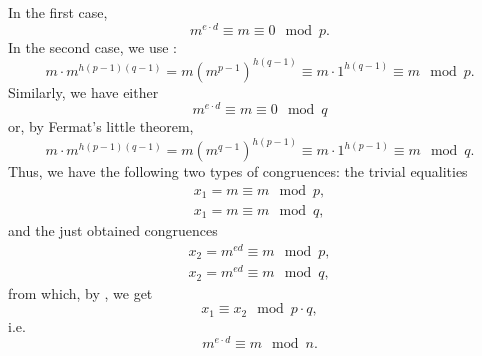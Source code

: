 In the first case,
\[
m^{e \cdot d} \equiv m \equiv 0 \mod{p}.
\]
In the second case, we use
:
\[
m \cdot m^{h \left(p - 1\right)\left(q - 1\right)} 
= m \left(m^{p - 1}\right)^{h \left(q - 1\right)} \equiv m \cdot 1^{h
  \left(q - 1\right)} \equiv m \mod{p}.
\]
Similarly, we have either
\[
m^{e \cdot d} \equiv m \equiv 0 \mod{q}
\]
or, by Fermat's little theorem,
\[
m \cdot m^{h \left(p - 1\right)\left(q - 1\right)} 
= m \left(m^{q - 1}\right)^{h \left(p - 1\right)} \equiv m \cdot 1^{h
  \left(p - 1\right)} \equiv m \mod{q}.
\]
Thus, we have the following two types of congruences:
the trivial equalities
\begin{eqnarray}
x_1 = m \equiv m \mod p,
\nonumber \\
x_1 = m \equiv m \mod q,
\nonumber
\end{eqnarray}
and the just obtained congruences
\begin{eqnarray}
x_2 = m^{ed} \equiv m \mod p,
\nonumber \\
x_2 = m^{ed} \equiv m \mod q,
\nonumber
\end{eqnarray}
from which, by , 
we get
\[
x_1 \equiv x_2 \mod p \cdot q,
\]
i.e.
\[
m^{e \cdot d} \equiv m \mod n.
\]